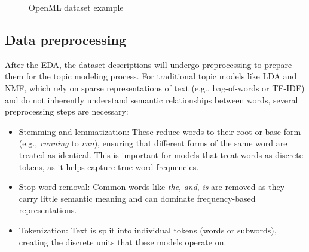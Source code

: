 \begin{figure}[h]
    \centering
    \hfill
    \caption{OpenML dataset example}
    \label{fig:dataset_examples}
\end{figure}

\subsection{Data preprocessing}
After the EDA, the dataset descriptions will undergo preprocessing to prepare them for the topic modeling process. For traditional topic models like LDA and NMF, which rely on sparse representations of text (e.g., bag-of-words or TF-IDF) and do not inherently understand semantic relationships between words, several preprocessing steps are necessary:

\begin{itemize}
    \item Stemming and lemmatization: These reduce words to their root or base form (e.g., \textit{running} to \textit{run}), ensuring that different forms of the same word are treated as identical. This is important for models that treat words as discrete tokens, as it helps capture true word frequencies.
    \item Stop-word removal: Common words like \textit{the}, \textit{and}, \textit{is} are removed as they carry little semantic meaning and can dominate frequency-based representations.
    \item Tokenization: Text is split into individual tokens (words or subwords), creating the discrete units that these models operate on.
\end{itemize}

